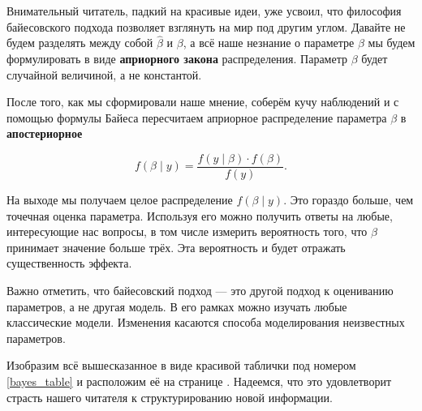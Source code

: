 \documentclass[12pt, a4paper, oneside]{extreport}
\def \hb{\hat{\beta}}
\newcommand{\indef}[1]{\textbf{#1}}     %
\theoremstyle{plain}              %
\theoremstyle{definition}         %
\begin{document}
Внимательный читатель, падкий на красивые идеи, уже усвоил, что философия байесовского подхода позволяет взглянуть на мир под другим углом. Давайте не будем разделять между собой $\hb$ и $\beta$, а всё наше незнание о параметре $\beta$ мы будем формулировать в виде \indef{априорного закона} распределения. Параметр $\beta$ будет случайной величиной, а не константой.

После того, как мы сформировали наше мнение, соберём кучу наблюдений и с помощью формулы Байеса пересчитаем априорное распределение параметра $\beta$ в \indef{апостериорное}

\[ f(\beta \mid y) = \frac{ f(y \mid \beta) \cdot f(\beta)}{f(y)}.\]

На выходе мы получаем целое распределение $f(\beta \mid y)$. Это гораздо больше, чем точечная оценка параметра. Используя его можно получить ответы на любые, интересующие нас вопросы, в том числе измерить вероятность того, что $\beta$ принимает значение больше трёх. Эта вероятность и будет отражать существенность эффекта.

Важно отметить, что байесовский подход --- это другой подход к оцениванию параметров, а не другая модель. В его рамках можно изучать любые классические модели. Изменения касаются способа моделирования неизвестных параметров.

Изобразим всё вышесказанное в виде красивой таблички под номером \ref{bayes_table} и расположим её на странице \pageref{bayes_table}. Надеемся, что это удовлетворит страсть нашего читателя к структурированию новой информации.
\end{document}
